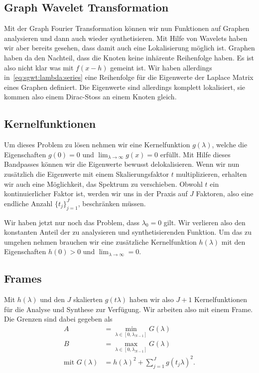 \subsection{Graph Wavelet Transformation\label{subsec:sgwt:gwt}}

Mit der Graph Fourier Transformation k\"onnen wir nun Funktionen auf Graphen 
analysieren und dann auch wieder synthetisieren. Mit Hilfe von Wavelets haben 
wir aber bereits gesehen, dass damit auch eine Lokalisierung m\"oglich ist. 
Graphen haben da den Nachteil, dass die Knoten keine inh\"arente Reihenfolge 
haben. Es ist also nicht klar was mit $f(x - h)$ gemeint ist. Wir haben 
allerdings in~\cref{eq:sgwt:lambda:series} eine Reihenfolge f\"ur die 
Eigenwerte der Laplace Matrix eines Graphen definiert. Die Eigenwerte sind 
allerdings komplett lokalisiert, sie kommen also einem Dirac-Stoss an 
einem Knoten gleich.

\subsection{Kernelfunktionen}

Um dieses Problem zu l\"osen nehmen wir eine Kernelfunktion $g(\lambda)$, 
welche die Eigenschaften $g(0) = 0$ und $\lim_{\lambda\to\infty} g(x) = 0$ 
erf\"ullt. Mit Hilfe dieses Bandpasses k\"onnen wir die Eigenwerte bewusst 
delokalisieren. Wenn wir nun zus\"atzlich die Eigenwerte mit einem 
Skalierungsfaktor $t$ multiplizieren, erhalten wir auch eine 
M\"oglichkeit, das Spektrum zu verschieben. Obwohl $t$ ein kontinuierlicher 
Faktor ist, werden wir uns in der Praxis auf $J$ Faktoren, also eine endliche 
Anzahl $\{t_j\}^J_{j=1}$, beschr\"anken m\"ussen.

Wir haben jetzt nur noch das Problem, dass $\lambda_0 = 0$ gilt. Wir verlieren 
also den konstanten Anteil der zu analysieren und synthetisierenden Funktion. 
Um das zu umgehen nehmen brauchen wir eine zus\"atzliche Kernelfunktion 
$h(\lambda)$ mit den Eigenschaften $h(0) > 0$ und $\lim_{\lambda\to\infty} = 0$.

\subsection{Frames}

Mit $h(\lambda)$ und den $J$ skalierten $g(t\lambda)$ haben wir also $J + 1$ 
Kernelfunktionen f\"ur die Analyse und Synthese zur Verf\"ugung. Wir arbeiten 
also mit einem Frame. Die Grenzen sind dabei gegeben als
\begin{align*}
A &= \min_{\lambda \in \left[0, \lambda_{N-1}\right]} G(\lambda) \\
B &= \max_{\lambda \in \left[0, \lambda_{N-1}\right]} G(\lambda) \\
\text{mit } G(\lambda) &= h(\lambda)^2 + \sum_{j = 1}^{J} g(t_j\lambda)^2.
\end{align*}

